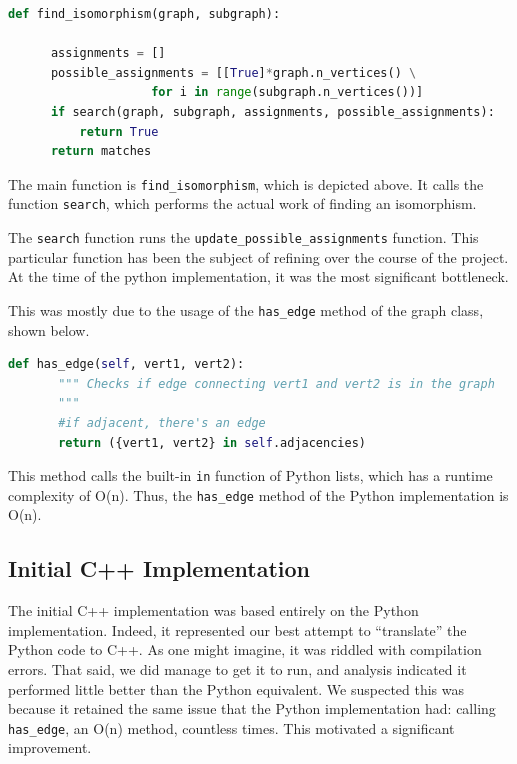 \documentclass{article}
\begin{document}
  \begin{lstlisting}[language=Python,caption={Function used to determine whether an isomorphism exists.}]
  def find_isomorphism(graph, subgraph):

      assignments = []
      possible_assignments = [[True]*graph.n_vertices() \
                    for i in range(subgraph.n_vertices())]
      if search(graph, subgraph, assignments, possible_assignments):
          return True
      return matches
  \end{lstlisting}

  The main function is \texttt{find\_isomorphism}, which is depicted above. It calls the function \texttt{search}, which performs the actual work of finding an isomorphism.

  The \texttt{search} function runs  the \texttt{update\_possible\_assignments} function. This particular function has been the subject of refining over the course of the project. At the time of the python implementation, it was the most significant bottleneck.

  This was mostly due to the usage of the \texttt{has\_edge} method of the graph class, shown below.

  \begin{lstlisting}[language=Python,caption={Code for the \texttt{has\_edge} method of our graph class.}]
  def has_edge(self, vert1, vert2):
       """ Checks if edge connecting vert1 and vert2 is in the graph
       """
       #if adjacent, there's an edge
       return ({vert1, vert2} in self.adjacencies)

  \end{lstlisting}

  This method calls the built-in \texttt{in} function of Python lists, which has a runtime complexity of O(n).\cite{bigopy} Thus, the \texttt{has\_edge} method of the Python implementation is O(n).

  \subsection{Initial C++ Implementation}

  The initial C++ implementation was based entirely on the Python implementation. Indeed, it represented our best attempt to ``translate'' the Python code to C++. As one might imagine, it was riddled with compilation errors. That said, we did manage to get it to run, and analysis indicated it performed little better than the Python equivalent. We suspected this was because it retained the same issue that the Python implementation had: calling \texttt{has\_edge}, an O(n) method, countless times. This motivated a significant improvement.
\end{document}
